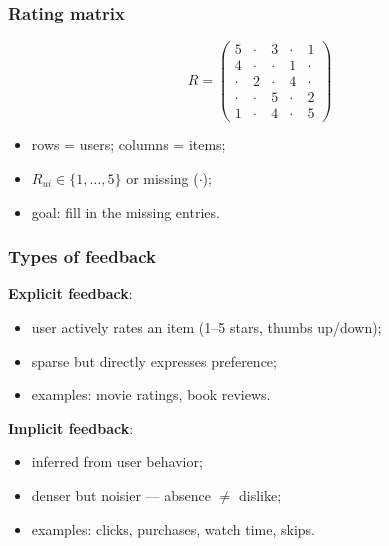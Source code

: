 \documentclass[]{beamer}
\begin{document}
\begin{frame}[fragile]
\frametitle{Rating matrix}
\begin{equation*}
R = \begin{pmatrix}
  5 & \cdot & 3 & \cdot & 1 \\
  4 & \cdot & \cdot & 1 & \cdot \\
  \cdot & 2 & \cdot & 4 & \cdot \\
  \cdot & \cdot & 5 & \cdot & 2 \\
  1 & \cdot & 4 & \cdot & 5
\end{pmatrix}
\end{equation*}

\begin{itemize}
  \item rows = users; columns = items;
  \item $R_{ui} \in \{1,\dots,5\}$ or missing ($\cdot$);
  \item goal: fill in the missing entries.
\end{itemize}

\end{frame}

\begin{frame}[fragile]
\frametitle{Types of feedback}
\textbf{Explicit feedback}:
\begin{itemize}
  \item user actively rates an item (1--5 stars, thumbs up/down);
  \item sparse but directly expresses preference;
  \item examples: movie ratings, book reviews.
\end{itemize}

\textbf{Implicit feedback}:
\begin{itemize}
  \item inferred from user behavior;
  \item denser but noisier --- absence $\neq$ dislike;
  \item examples: clicks, purchases, watch time, skips.
\end{itemize}

\end{frame}
\end{document}
